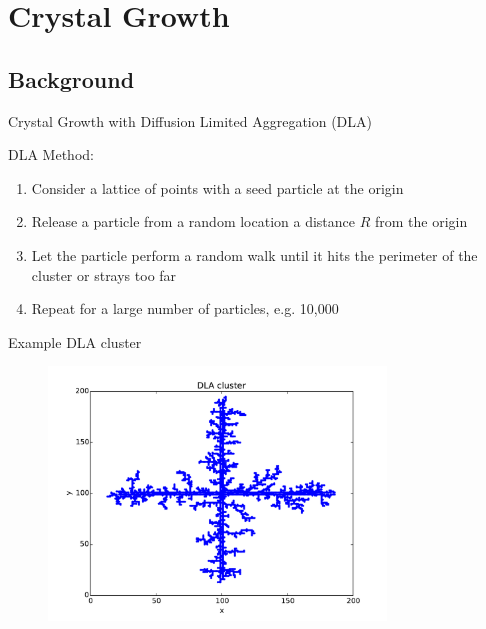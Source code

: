 \documentclass{beamer}
\begin{document}

\section{Crystal Growth}


\subsection{Background}

\begin{frame}{Crystal Growth with Diffusion Limited Aggregation (DLA)}

DLA Method:

\begin{enumerate}

\item Consider a lattice of points with a seed particle at the origin

\item Release a particle from a random location a distance $R$ from the origin

\item Let the particle perform a random walk until it hits the perimeter of the cluster or strays too far

\item Repeat for a large number of particles, e.g. 10,000

\end{enumerate}

\end{frame}

\begin{frame}{Example DLA cluster}

\begin{figure}[H]
	\centering
	\includegraphics[width=0.8\textwidth]{dla.pdf}
\end{figure}

\end{frame}
\end{document}
